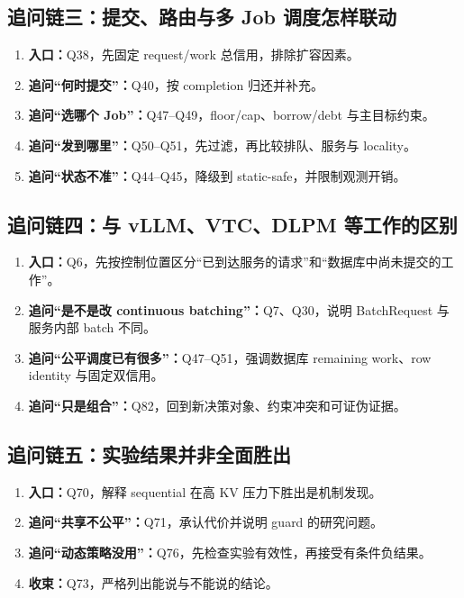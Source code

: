 \documentclass[10pt,a4paper]{ctexart}
\begin{document}
\subsection{追问链三：提交、路由与多 Job 调度怎样联动}
\begin{enumerate}
  \item \textbf{入口：}Q38，先固定 request/work 总信用，排除扩容因素。
  \item \textbf{追问“何时提交”：}Q40，按 completion 归还并补充。
  \item \textbf{追问“选哪个 Job”：}Q47--Q49，floor/cap、borrow/debt 与主目标约束。
  \item \textbf{追问“发到哪里”：}Q50--Q51，先过滤，再比较排队、服务与 locality。
  \item \textbf{追问“状态不准”：}Q44--Q45，降级到 static-safe，并限制观测开销。
\end{enumerate}

\subsection{追问链四：与 vLLM、VTC、DLPM 等工作的区别}
\begin{enumerate}
  \item \textbf{入口：}Q6，先按控制位置区分“已到达服务的请求”和“数据库中尚未提交的工作”。
  \item \textbf{追问“是不是改 continuous batching”：}Q7、Q30，说明 BatchRequest 与服务内部 batch 不同。
  \item \textbf{追问“公平调度已有很多”：}Q47--Q51，强调数据库 remaining work、row identity 与固定双信用。
  \item \textbf{追问“只是组合”：}Q82，回到新决策对象、约束冲突和可证伪证据。
\end{enumerate}

\subsection{追问链五：实验结果并非全面胜出}
\begin{enumerate}
  \item \textbf{入口：}Q70，解释 sequential 在高 KV 压力下胜出是机制发现。
  \item \textbf{追问“共享不公平”：}Q71，承认代价并说明 guard 的研究问题。
  \item \textbf{追问“动态策略没用”：}Q76，先检查实验有效性，再接受有条件负结果。
  \item \textbf{收束：}Q73，严格列出能说与不能说的结论。
\end{enumerate}
\end{document}

